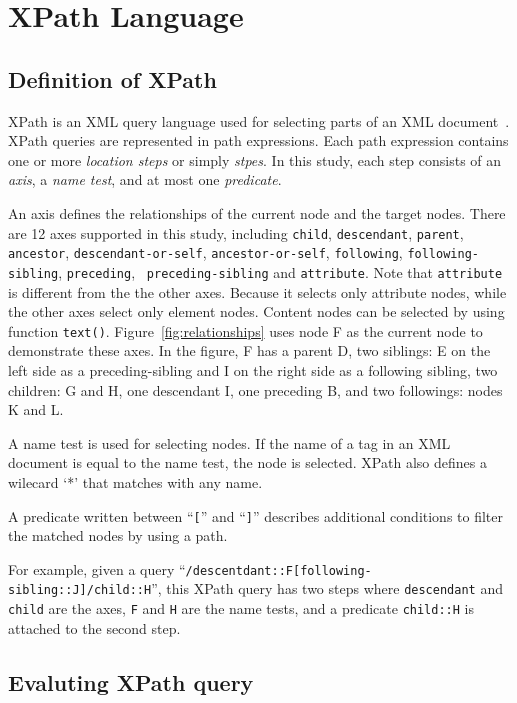 \section{XPath Language}
\label{sec:xpath}

\subsection{Definition of XPath}

XPath is an XML query language used for selecting parts of an XML
document~\cite{xpath}. XPath queries are represented in path expressions. Each
path expression contains one or more \emph{location steps} or simply
\emph{stpes}. In this study, each step consists of an \emph{axis}, a \emph{name
test}, and at most one \emph{predicate}.

An axis defines the relationships of the current node and the target nodes.
There are 12 axes supported in this study, including  \texttt{child},
\texttt{descendant}, \texttt{parent}, \texttt{ancestor},
\texttt{descendant-or-self}, \texttt{ancestor-or-self}, \texttt{following},
\texttt{following-sibling}, \texttt{preceding}, \texttt{ preceding-sibling}  and
\texttt{attribute}. Note that \texttt{attribute} is different from the the other
axes. Because it selects only attribute nodes, while the other axes select only
element nodes. Content nodes can be selected by using function \texttt{text()}.
Figure~\ref{fig:relationships} uses node F as the current node to demonstrate
these axes. In the figure, F has a parent D, two siblings: E  on the left side
as a preceding-sibling and I on the right side as a following sibling, two
children: G and H, one descendant I, one preceding B, and two followings: nodes
K and L.

A name test is used for selecting nodes. If the name of a tag in an XML document
is equal to the name test, the node is selected. XPath also defines a wilecard  `*'
that matches with any name.

A predicate written between ``\verb|[|'' and ``\verb|]|'' describes additional
conditions to filter the matched nodes by using a path.

For example, given a query
``\verb|/descentdant::F[following-sibling::J]/child::H|'', this XPath query has
two steps where \verb|descendant| and \verb|child| are the axes, \verb|F| and
\verb|H| are the name tests, and a predicate \verb|child::H| is attached to the
second step.

\subsection{Evaluting XPath query}


